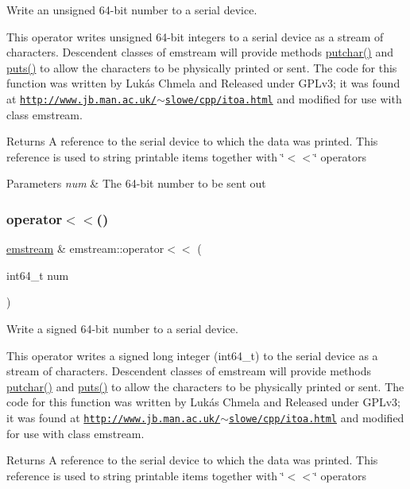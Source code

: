 Write an unsigned 64-\/bit number to a serial device. 

This operator writes unsigned 64-\/bit integers to a serial device as a stream of characters. Descendent classes of {\ttfamily emstream} will provide methods {\ttfamily \mbox{\hyperlink{classemstream_aa4dffc9aa58f601cc4153b4cbe65d757}{putchar()}}} and {\ttfamily \mbox{\hyperlink{classemstream_a1ad530cbebe6c54640c1db8c1b9afda2}{puts()}}} to allow the characters to be physically printed or sent. The code for this function was written by Lukás Chmela and Released under G\+P\+Lv3; it was found at \href{http://www.jb.man.ac.uk/~slowe/cpp/itoa.html}{\tt http\+://www.\+jb.\+man.\+ac.\+uk/$\sim$slowe/cpp/itoa.\+html} and modified for use with class {\ttfamily emstream}. \begin{DoxyReturn}{Returns}
A reference to the serial device to which the data was printed. This reference is used to string printable items together with \char`\"{}$<$$<$\char`\"{} operators 
\end{DoxyReturn}

\begin{DoxyParams}{Parameters}
{\em num} & The 64-\/bit number to be sent out \\
\hline
\end{DoxyParams}
\mbox{\label{classemstream_ad0b6eeba3130fb192413f43cfb1670fe}} 
\subsubsection{\texorpdfstring{operator$<$$<$()}{operator<<()}\hspace{0.1cm}{\footnotesize\ttfamily [10/14]}}
{\footnotesize\ttfamily \mbox{\hyperlink{classemstream}{emstream}} \& emstream\+::operator$<$$<$ (\begin{DoxyParamCaption}\item[{int64\+\_\+t}]{num }\end{DoxyParamCaption})}



Write a signed 64-\/bit number to a serial device. 

This operator writes a signed long integer ({\ttfamily int64\+\_\+t}) to the serial device as a stream of characters. Descendent classes of {\ttfamily emstream} will provide methods {\ttfamily \mbox{\hyperlink{classemstream_aa4dffc9aa58f601cc4153b4cbe65d757}{putchar()}}} and {\ttfamily \mbox{\hyperlink{classemstream_a1ad530cbebe6c54640c1db8c1b9afda2}{puts()}}} to allow the characters to be physically printed or sent. The code for this function was written by Lukás Chmela and Released under G\+P\+Lv3; it was found at \href{http://www.jb.man.ac.uk/~slowe/cpp/itoa.html}{\tt http\+://www.\+jb.\+man.\+ac.\+uk/$\sim$slowe/cpp/itoa.\+html} and modified for use with class {\ttfamily emstream}. \begin{DoxyReturn}{Returns}
A reference to the serial device to which the data was printed. This reference is used to string printable items together with \char`\"{}$<$$<$\char`\"{} operators 
\end{DoxyReturn}

